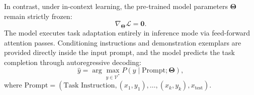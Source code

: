 \documentclass[../../../main.tex]{subfiles}
\begin{document}
In contrast, under in-context learning, the pre-trained model parameters $\boldsymbol{\Theta}$ remain strictly frozen:
\begin{equation}
\nabla_{\boldsymbol{\Theta}} \mathcal{L} = \mathbf{0}.
\label{eq:frozen_parameters}
\end{equation}
The model executes task adaptation entirely in inference mode via feed-forward attention passes. Conditioning instructions and demonstration exemplars are provided directly inside the input prompt, and the model predicts the task completion through autoregressive decoding:
\begin{equation}
\hat{y} = \arg\max_{y \in \mathcal{V}^*} P(y \mid \text{Prompt}; \boldsymbol{\Theta}),
\label{eq:icl_generation}
\end{equation}
where $\text{Prompt} = (\text{Task Instruction}, (x_1, y_1), \dots, (x_k, y_k), x_{\text{test}})$.
\end{document}
